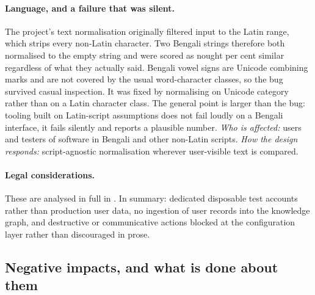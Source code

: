 \paragraph{Language, and a failure that was silent.} The project's text
normalisation originally filtered input to the Latin range, which strips every
non-Latin character. Two Bengali strings therefore both normalised to the empty
string and were scored as nought per cent similar regardless of what they
actually said. Bengali vowel signs are Unicode combining marks and are not
covered by the usual word-character classes, so the bug survived casual
inspection. It was fixed by normalising on Unicode category rather than on a
Latin character class. The general point is larger than the bug: tooling built
on Latin-script assumptions does not fail loudly on a Bengali interface, it
fails silently and reports a plausible number.
\emph{Who is affected:} users and testers of software in Bengali and other
non-Latin scripts. \emph{How the design responds:} script-agnostic
normalisation wherever user-visible text is compared.

\paragraph{Legal considerations.} These are analysed in full in
. In summary: dedicated disposable test accounts rather
than production user data, no ingestion of user records into the knowledge
graph, and destructive or communicative actions blocked at the configuration
layer rather than discouraged in prose.

\subsection*{Negative impacts, and what is done about them}

